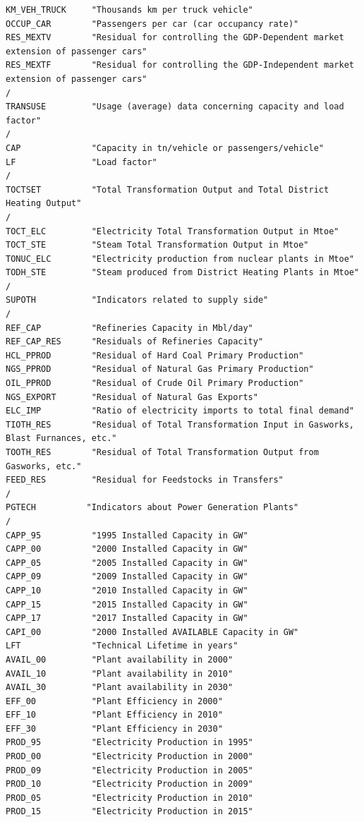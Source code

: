 \documentclass[a4paper,]{scrartcl}
\begin{document}
\begin{lstlisting}
KM_VEH_TRUCK     "Thousands km per truck vehicle"
OCCUP_CAR        "Passengers per car (car occupancy rate)"
RES_MEXTV        "Residual for controlling the GDP-Dependent market extension of passenger cars"
RES_MEXTF        "Residual for controlling the GDP-Independent market extension of passenger cars"
/
TRANSUSE         "Usage (average) data concerning capacity and load factor"
/
CAP              "Capacity in tn/vehicle or passengers/vehicle"
LF               "Load factor"
/
TOCTSET          "Total Transformation Output and Total District Heating Output"
/
TOCT_ELC         "Electricity Total Transformation Output in Mtoe"
TOCT_STE         "Steam Total Transformation Output in Mtoe"
TONUC_ELC        "Electricity production from nuclear plants in Mtoe"
TODH_STE         "Steam produced from District Heating Plants in Mtoe"
/
SUPOTH           "Indicators related to supply side"
/
REF_CAP          "Refineries Capacity in Mbl/day"
REF_CAP_RES      "Residuals of Refineries Capacity"
HCL_PPROD        "Residual of Hard Coal Primary Production"
NGS_PPROD        "Residual of Natural Gas Primary Production"
OIL_PPROD        "Residual of Crude Oil Primary Production"
NGS_EXPORT       "Residual of Natural Gas Exports"
ELC_IMP          "Ratio of electricity imports to total final demand"
TIOTH_RES        "Residual of Total Transformation Input in Gasworks, Blast Furnances, etc."
TOOTH_RES        "Residual of Total Transformation Output from Gasworks, etc."
FEED_RES         "Residual for Feedstocks in Transfers"
/
PGTECH          "Indicators about Power Generation Plants"
/
CAPP_95          "1995 Installed Capacity in GW"
CAPP_00          "2000 Installed Capacity in GW"
CAPP_05          "2005 Installed Capacity in GW"
CAPP_09          "2009 Installed Capacity in GW"
CAPP_10          "2010 Installed Capacity in GW"
CAPP_15          "2015 Installed Capacity in GW"
CAPP_17          "2017 Installed Capacity in GW"
CAPI_00          "2000 Installed AVAILABLE Capacity in GW"
LFT              "Technical Lifetime in years"
AVAIL_00         "Plant availability in 2000"
AVAIL_10         "Plant availability in 2010"
AVAIL_30         "Plant availability in 2030"
EFF_00           "Plant Efficiency in 2000"
EFF_10           "Plant Efficiency in 2010"
EFF_30           "Plant Efficiency in 2030"
PROD_95          "Electricity Production in 1995"
PROD_00          "Electricity Production in 2000"
PROD_09          "Electricity Production in 2005"
PROD_10          "Electricity Production in 2009"
PROD_05          "Electricity Production in 2010"
PROD_15          "Electricity Production in 2015"

\end{lstlisting}
\end{document}
